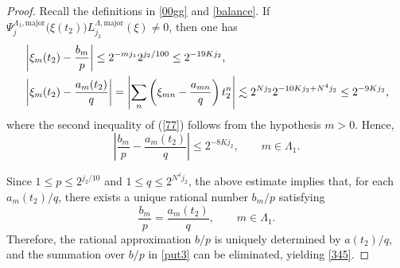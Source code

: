 \documentclass[11 pt,letterpaper]{amsart}
\theoremstyle{plain}
\theoremstyle{definition}
\theoremstyle{remark} \theoremstyle{exam} \theoremstyle{ob}
\numberwithin{equation}{section}
\begin{document}
\begin{proof}
Recall the definitions in \eqref{00gg} and \eqref{balance}. If $\Psi^{\Lambda_1,\mathrm{major}}_{j}\bigl(\xi(t_2)\bigr)
L^{\Lambda,\mathrm{major}}_{j_2}(\xi)\neq 0$, then one has
\begin{align}
&\left|
\xi_m(t_2)-\frac{b_m}{p}
\right|
\le
2^{-mj_1}2^{j_2/100}
\le
2^{-19Kj_2},\label{77}
\\
&\left|
\xi_m(t_2)-\frac{a_m(t_2)}{q}
\right|
=
\left|
\sum_n
\left(
\xi_{mn}-\frac{a_{mn}}{q}
\right)
t_2^n
\right|
\lesssim
2^{Nj_2}
2^{-10Kj_2+N^4j_2}
\le
2^{-9Kj_2},\notag
\end{align}
where the second inequality of (\ref{77}) follows from the hypothesis $m>0$.
Hence,
\[
\left|
\frac{b_m}{p}
-
\frac{a_m(t_2)}{q}
\right|
\le
2^{-8Kj_2},
\qquad
m\in\Lambda_1.
\]

Since
$1\le p\le2^{j_2/10}$
and
$1\le q\le2^{N^4j_2}$,
the above estimate implies that, for each
$a_m(t_2)/q$, there exists a unique rational number
$b_m/p$ satisfying
\begin{equation}
\frac{b_m}{p}
=
\frac{a_m(t_2)}{q},
\qquad
m\in\Lambda_1.
\end{equation}
Therefore, the rational approximation $b/p$ is uniquely determined by
$a(t_2)/q$, and the summation over $b/p$ in
\eqref{put3} can be eliminated, yielding
\eqref{345}.
\end{proof}
\end{document}
